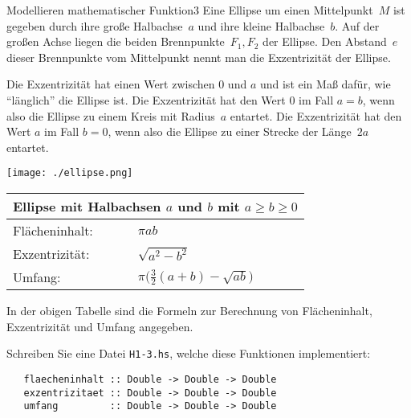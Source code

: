 \documentclass[11pt]{article}
\begin{document}
\begin{hausaufgabe}[hss]{Modellieren mathematischer Funktion}{3}\label{mathefun}%
  Eine Ellipse um einen Mittelpunkt~$M$ 
  ist gegeben durch ihre große Halbachse~$a$
  und ihre kleine Halbachse~$b$.
  Auf der großen Achse 
  liegen die beiden Brennpunkte~$F_1,F_2$ der Ellipse.
  Den Abstand~$e$ dieser Brennpunkte vom Mittelpunkt
  nennt man die Exzentrizität der Ellipse.

  Die Exzentrizität hat einen Wert zwischen $0$ und $a$ 
  und ist ein Maß dafür,
  wie "`länglich"' die Ellipse ist.
  Die Exzentrizität hat den Wert $0$ im Fall $a=b$,
  wenn also die Ellipse zu einem Kreis mit Radius~$a$ entartet.
  Die  Exzentrizität hat den Wert $a$ im Fall $b=0$,
  wenn also die Ellipse zu einer Strecke der Länge~$2a$ entartet.

  \vspace*{1ex}
  \begin{minipage}{30ex}
  \begin{center}
 \texttt{[image: ./ellipse.png]}
\end{center}
 \end{minipage}
  \hspace*{\fill}
  \begin{tabular}{ll}
    \multicolumn{2}{l}{Ellipse mit Halbachsen $a$ und $b$ mit $a \ge b \ge 0$}\\\hline
    Flächeninhalt: & $\pi a b$ \\
    Exzentrizität: & $\sqrt{a^2 - b^2}$ \\
    Umfang:        & $\pi \Big( \frac{3}{2}(a+b) - \sqrt{a b} \Big)$
  \end{tabular}
  \hspace*{\fill}
  \vspace*{3ex}

  In der obigen Tabelle sind die Formeln zur Berechnung
  von Flächeninhalt, Exzentrizität und Umfang angegeben.

  Schreiben Sie eine Datei \texttt{H1-3.hs}, welche diese Funktionen implementiert:
  \begin{verbatim}
   flaecheninhalt :: Double -> Double -> Double
   exzentrizitaet :: Double -> Double -> Double
   umfang         :: Double -> Double -> Double  \end{verbatim}
  

\end{hausaufgabe}
\end{document}
